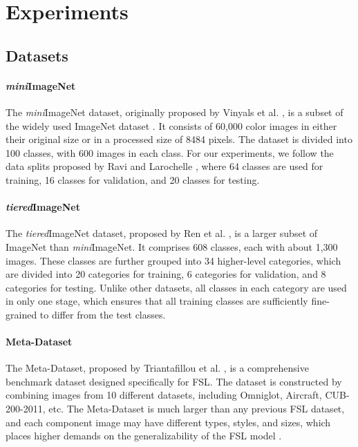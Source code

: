 \documentclass{article}
\begin{document}
\section{Experiments}


\subsection{Datasets}


\paragraph{\textit{mini}ImageNet} The \textit{mini}ImageNet dataset, originally proposed by Vinyals et al. \cite{i2}, is a subset of the widely used ImageNet dataset \cite{i37}. It consists of 60,000 color images in either their original size or in a processed size of 8484 pixels. The dataset is divided into 100 classes, with 600 images in each class. For our experiments, we follow the data splits proposed by Ravi and Larochelle \cite{i16}, where 64 classes are used for training, 16 classes for validation, and 20 classes for testing.


\paragraph{\textit{tiered}ImageNet} The \textit{tiered}ImageNet dataset, proposed by Ren et al. \cite{i6}, is a larger subset of ImageNet \cite{i37} than \textit{mini}ImageNet. It comprises 608 classes, each with about 1,300 images. These classes are further grouped into 34 higher-level categories, which are divided into 20 categories for training, 6 categories for validation, and 8 categories for testing.  Unlike other datasets, all classes in each category are used in only one stage, which ensures that all training classes are sufficiently fine-grained to differ from the test classes. 


\paragraph{Meta-Dataset} The Meta-Dataset, proposed by Triantafillou et al. \cite{i44}, is a comprehensive benchmark dataset designed specifically for FSL. The dataset is constructed by combining images from 10 different datasets, including Omniglot, Aircraft, CUB-200-2011, etc. The Meta-Dataset is much larger than any previous FSL dataset, and each component image may have different types, styles, and sizes, which places higher demands on the generalizability of the FSL model \cite{i44}.
\end{document}
